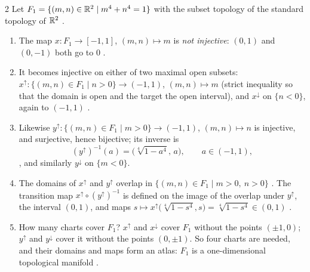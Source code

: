\begin{paracol}{2}
Let $F_1=\{(m,n)\in\mathbb{R}^2\mid m^4+n^4=1\}$ with the subset topology of the standard topology of $\mathbb{R}^2$ .
\begin{enumerate}
  \item The map $x\colon F_1\to[-1,1]$, $(m,n)\mapsto m$ is \emph{not injective}: $(0,1)$ and $(0,-1)$ both go to $0$ .
  \item It becomes injective on either of two maximal open subsets: $x^\uparrow\colon\{(m,n)\in F_1\mid n>0\}\to(-1,1)$, $(m,n)\mapsto m$ (strict inequality so that the domain is open and the target the open interval), and
        $x^\downarrow$ on $\{n<0\}$, again to $(-1,1)$ .
  \item Likewise $y^\uparrow\colon\{(m,n)\in F_1\mid m>0\}\to(-1,1)$, $(m,n)\mapsto n$ is injective, and surjective, hence bijective; its inverse is
        \[
          (y^\uparrow)^{-1}(a)=\bigl(\sqrt[4]{1-a^4},\,a\bigr),\qquad a\in(-1,1),
        \]
        , and similarly $y^\downarrow$ on $\{m<0\}$.
  \item The domains of $x^\uparrow$ and $y^\uparrow$ overlap in $\{(m,n)\in F_1\mid m>0,\ n>0\}$ . The transition map $x^\uparrow\circ(y^\uparrow)^{-1}$ is defined on the image of the overlap under $y^\uparrow$, the interval $(0,1)$, and maps
        $s\mapsto x^\uparrow\bigl(\sqrt[4]{1-s^4},s\bigr)=\sqrt[4]{1-s^4}\in(0,1)$ .
  \item How many charts cover $F_1$? $x^\uparrow$ and $x^\downarrow$ cover $F_1$ without the points $(\pm1,0)$; $y^\uparrow$ and $y^\downarrow$ cover it without the points $(0,\pm1)$. So four charts are needed, and their domains and maps form an atlas: $F_1$ is a one-dimensional topological manifold
        .
\end{enumerate}


\end{paracol}
